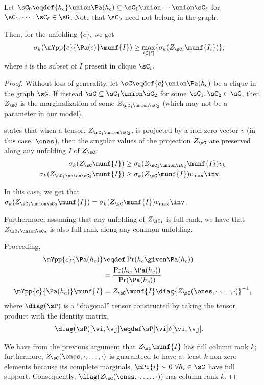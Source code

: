 \begin{lemma} 
  Let $\sC_0 \eqdef {h_c} \union \Pa(h_c) \subseteq \sC_1 \union \cdots
  \union \sC_\ell$ for $\sC_1, \cdots, \sC_\ell \in \sG$. Note that
  $\sC_0$ need not belong in the graph.

  Then, for the unfolding $\{c\}$, we get 
  \begin{align*}
    \sigma_{k}(\mYpp{c}{\Pa(c)}\munf{I}) &\ge \max_{i\in[\ell]}\{\sigma_{k}(Z_{\sC_i}\munf{I_i})\},
  \end{align*}
  where $i$ is the subset of $I$ present in clique $\sC_i$.
\end{lemma} 
\begin{proof}
Without loss of generality, let $\sC \eqdef \{c\} \union \Pa(h_c)$ be a clique
  in the graph $\sG$.
If instead $\sC \subseteq \sC_1 \union \sC_2$ for some $\sC_1, \sC_2 \in
\sG$, then $Z_{\sC}$ is the marginalization of some $Z_{\sC_1 \union \sC_2}$
(which may not be a parameter in our model). 

 states that when a tensor, $Z_{\sC_1 \union
\sC_2}$, is projected by a non-zero vector $v$ (in this case, $\ones$),
then the singular values of the projection $Z_\sC$ are preserved along
any unfolding $I$ of $Z_\sC$:
\begin{align*}
  \sigma_{k}(Z_{\sC}\munf{I}) &\ge \sigma_{k}(Z_{\sC_1 \union \sC_2}\munf{I})v_{k} \\
  \sigma_{k}(Z_{\sC_1 \union \sC_2}\munf{I}) &\ge
  \sigma_{k}(Z_{\sC}\munf{I})v_{\max}\inv.
\end{align*}

In this case, we get that $\sigma_{k}(Z_{\sC_1 \union \sC_2}\munf{I})
= \sigma_{k}(Z_{\sC}\munf{I})v_{\max}\inv$.

Furthermore, assuming that any unfolding of $Z_{\sC_1}$ is full rank, we
have that $Z_{\sC_1 \union \sC_2}$ is also full rank along any common
unfolding. 

Proceeding,
\begin{align*}
\mYpp{c}{\Pa(h_c)} 
  &\eqdef \Pr(h_c \given \Pa(h_c)) \\
  &= \frac{\Pr(h_c, \Pa(h_c))}{\Pr(\Pa(h_c))} \\
  \mYpp{c}{\Pa(h_c)}\munf{I}
  &= Z_\sC\munf{I} \diag{Z_\sC(\ones, \cdot, \ldots, \cdot)}^{-1},
\end{align*}
where $\diag(\sP)$ is a ``diagonal'' tensor constructed by taking the
tensor product with the identity matrix,
\begin{align*}
  \diag(\sP)[\vi,\vj] &\eqdef \sP[\vi] \delta[\vi,\vj].
\end{align*}

We have from the previous argument that $Z_\sC\munf{I}$ has full column
rank $k$; furthermore, $Z_\sC(\ones, \cdot, \ldots, \cdot)$ is
guaranteed to have at least $k$ non-zero elements because its complete
marginals, $\mPi{i} \succ 0 ~\forall h_i \in \sC$ have full support. 
Consequently, $\diag(Z_\sC(\ones, \cdot, \ldots, \cdot))$ has column rank $k$.
\end{proof}


